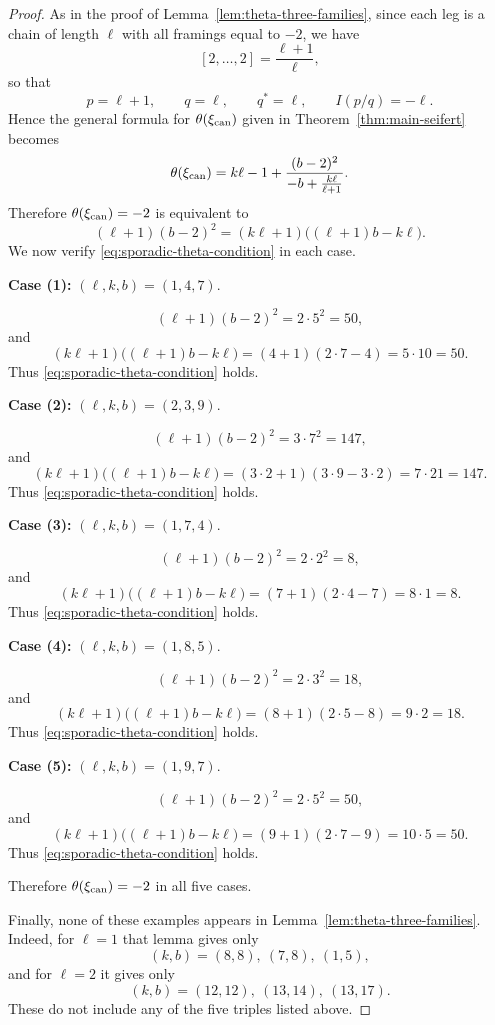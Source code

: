 \documentclass[11pt]{amsart}
\theoremstyle{plain}
\theoremstyle{definition}
\theoremstyle{remark}
\begin{document}
\begin{proof}
As in the proof of Lemma~\ref{lem:theta-three-families}, since each leg is a chain of length $\ell$ with all framings equal to $-2$, we have
\[
[2,\dots,2]=\frac{\ell+1}{\ell},
\]
so that
\[
p=\ell+1,\qquad q=\ell,\qquad q^*=\ell,\qquad I(p/q)=-\ell.
\]
Hence the general formula for $\theta(\xi_{\rm can})$ given in Theorem~\ref{thm:main-seifert} becomes
\[
\theta(\xi_{\rm can})
=
k\ell-1+\frac{(b-2)^2}{-b+\frac{k\ell}{\ell+1}}.
\]
Therefore $\theta(\xi_{\rm can})=-2$ is equivalent to
\begin{equation}\label{eq:sporadic-theta-condition}
(\ell+1)(b-2)^2=(k\ell+1)\big((\ell+1)b-k\ell\big).
\end{equation}
We now verify \eqref{eq:sporadic-theta-condition} in each case.

\medskip

\noindent
\textbf{Case (1):} $(\ell,k,b)=(1,4,7)$.

\[
(\ell+1)(b-2)^2=2\cdot 5^2=50,
\]
and
\[
(k\ell+1)\big((\ell+1)b-k\ell\big)
=(4+1)(2\cdot 7-4)=5\cdot 10=50.
\]
Thus \eqref{eq:sporadic-theta-condition} holds.

\medskip

\noindent
\textbf{Case (2):} $(\ell,k,b)=(2,3,9)$.

\[
(\ell+1)(b-2)^2=3\cdot 7^2=147,
\]
and
\[
(k\ell+1)\big((\ell+1)b-k\ell\big)
=(3\cdot 2+1)(3\cdot 9-3\cdot 2)=7\cdot 21=147.
\]
Thus \eqref{eq:sporadic-theta-condition} holds.

\medskip

\noindent
\textbf{Case (3):} $(\ell,k,b)=(1,7,4)$.

\[
(\ell+1)(b-2)^2=2\cdot 2^2=8,
\]
and
\[
(k\ell+1)\big((\ell+1)b-k\ell\big)
=(7+1)(2\cdot 4-7)=8\cdot 1=8.
\]
Thus \eqref{eq:sporadic-theta-condition} holds.

\medskip

\noindent
\textbf{Case (4):} $(\ell,k,b)=(1,8,5)$.

\[
(\ell+1)(b-2)^2=2\cdot 3^2=18,
\]
and
\[
(k\ell+1)\big((\ell+1)b-k\ell\big)
=(8+1)(2\cdot 5-8)=9\cdot 2=18.
\]
Thus \eqref{eq:sporadic-theta-condition} holds.

\medskip

\noindent
\textbf{Case (5):} $(\ell,k,b)=(1,9,7)$.

\[
(\ell+1)(b-2)^2=2\cdot 5^2=50,
\]
and
\[
(k\ell+1)\big((\ell+1)b-k\ell\big)
=(9+1)(2\cdot 7-9)=10\cdot 5=50.
\]
Thus \eqref{eq:sporadic-theta-condition} holds.

Therefore $\theta(\xi_{\rm can})=-2$ in all five cases.

Finally, none of these examples appears in Lemma~\ref{lem:theta-three-families}. Indeed, for $\ell=1$ that lemma gives only
\[
(k,b)=(8,8),\ (7,8),\ (1,5),
\]
and for $\ell=2$ it gives only
\[
(k,b)=(12,12),\ (13,14),\ (13,17).
\]
These do not include any of the five triples listed above.
\end{proof}
\end{document}
